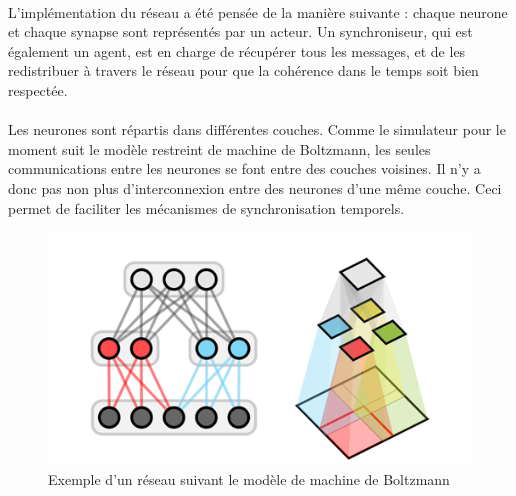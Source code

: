 \documentclass[a4paper,10pt]{article}
\begin{document}
\paragraph{}
L’implémentation du réseau a été pensée de la manière suivante : chaque neurone et chaque synapse sont représentés par un acteur. Un synchroniseur, qui est également  un agent, est en charge de récupérer tous les messages, et de les redistribuer à travers le réseau pour que la cohérence dans le temps soit bien respectée.
\newpage
\paragraph{}
Les neurones sont répartis dans différentes couches. Comme le simulateur pour le moment suit le modèle restreint de machine de Boltzmann, les seules communications entre les neurones se font entre des couches voisines. Il n'y a donc pas non plus d’interconnexion entre des neurones d'une même couche. Ceci permet de faciliter les mécanismes de synchronisation temporels.

\begin{figure}[h!]
\centering
\includegraphics[scale=0.4]{image/boltzmann.png}
\caption{Exemple d'un réseau suivant le modèle de machine de Boltzmann}
\end{figure}
\end{document}

